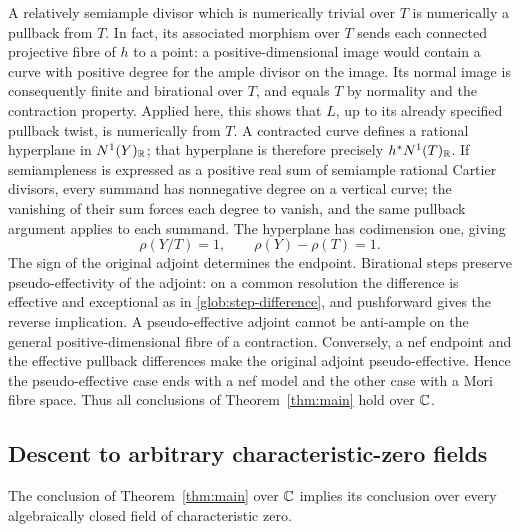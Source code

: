 A relatively semiample divisor which is numerically trivial over $T$
is numerically a pullback from $T$.  In fact, its associated morphism
over $T$ sends each connected projective fibre of $h$ to a point: a
positive-dimensional image would contain a curve with positive degree
for the ample divisor on the image.  Its normal image is consequently
finite and birational over $T$, and equals $T$ by normality and the
contraction property.  Applied here, this shows that $L$, up to its
already specified pullback twist, is numerically from $T$.  A contracted
curve defines a rational hyperplane in $N^1(Y)_\mathbb R$; that hyperplane is
therefore precisely $h^*N^1(T)_\mathbb R$.  If semiampleness is expressed as a
positive real sum of semiample rational Cartier divisors, every summand
has nonnegative degree on a vertical curve; the vanishing of their sum
forces each degree to vanish, and the same pullback argument applies to
each summand.  The hyperplane has codimension one, giving
\[
 \rho(Y/T)=1,\qquad \rho(Y)-\rho(T)=1.
\]
The sign of the original adjoint determines the endpoint. Birational
steps preserve pseudo-effectivity of the adjoint: on a common
resolution the difference is effective and exceptional as in
\eqref{glob:step-difference}, and pushforward gives the reverse
implication. A pseudo-effective adjoint cannot be anti-ample on the
general positive-dimensional fibre of a contraction. Conversely, a nef
endpoint and the effective pullback differences make the original
adjoint pseudo-effective. Hence the pseudo-effective case ends with a
nef model and the other case with a Mori fibre space. Thus all
conclusions of Theorem~\ref{thm:main} hold over $\mathbb C$.

\subsection{Descent to arbitrary characteristic-zero fields}

\begin{proposition}\label{prop:field-descent}
The conclusion of Theorem~\ref{thm:main} over $\mathbb C$ implies its conclusion
over every algebraically closed field of characteristic zero.
\end{proposition}

